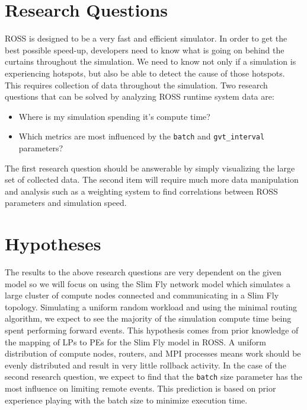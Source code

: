 \documentclass[12pt]{article}
\begin{document}
\section{Research Questions} \label{questions}

ROSS is designed to be a very fast and efficient simulator. In order to get the best possible speed-up, developers need to know what is going on behind the curtains throughout the simulation. We need to know not only if a simulation is experiencing hotspots, but also be able to detect the cause of those hotspots. This requires collection of data throughout the simulation. Two research questions that can be solved by analyzing ROSS runtime system data are:

\begin{itemize}
  \item Where is my simulation spending it's compute time?
  \item Which metrics are most influenced by the \texttt{batch} and \texttt{gvt\_interval} parameters?
\end{itemize}

The first research question should be answerable by simply visualizing the large set of collected data. 
The second item will require much more data manipulation and analysis such as a weighting system to find correlations between ROSS parameters and simulation speed.

\section{Hypotheses}

The results to the above research questions are very dependent on the given model so we will focus on using the Slim Fly network model which simulates a large cluster of compute nodes connected and communicating in a Slim Fly topology. Simulating a uniform random workload and using the minimal routing algorithm, we expect to see the majority of the simulation compute time being spent performing forward events. This hypothesis comes from prior knowledge of the mapping of LPs to PEs for the Slim Fly model in ROSS. A uniform distribution of compute nodes, routers, and MPI processes means work should be evenly distributed and result in very little rollback activity. In the case of the second research question, we expect to find that the \texttt{batch} size parameter has the most influence on limiting remote events. This prediction is based on prior experience playing with the batch size to minimize execution time.
\end{document}
